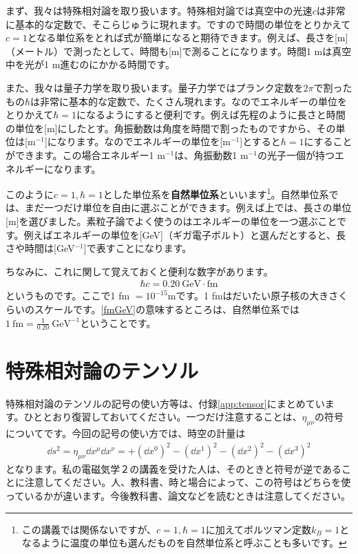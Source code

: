 \documentclass[report,paper=a4, fontsize=12pt, line_length=16cm, number_of_lines=33,dvipdfmx]{jlreq}
\numberwithin{equation}{chapter}
\newcommand{\strong}[1]{{\sffamily \bfseries #1}}
\begin{document}
まず、我々は特殊相対論を取り扱います。特殊相対論では真空中の光速$c$は非常に基本的な定数で、そこらじゅうに現れます。ですので時間の単位をとりかえて$c=1$となる単位系をとれば式が簡単になると期待できます。例えば、長さを[m]（メートル）で測ったとして、時間も[m]で測ることになります。時間1 mは真空中を光が1 m進むのにかかる時間です。

また、我々は量子力学を取り扱います。量子力学ではプランク定数を$2\pi$で割ったもの$\hbar$は非常に基本的な定数で、たくさん現れます。なのでエネルギーの単位をとりかえて$\hbar=1$になるようにすると便利です。例えば先程のように長さと時間の単位を[m]にしたとす。角振動数は角度を時間で割ったものですから、その単位は[m${}^{-1}$]になります。なのでエネルギーの単位を[m${}^{-1}$]とすると$\hbar=1$にすることができます。この場合エネルギー1 m${}^{-1}$は、角振動数1 m${}^{-1}$の光子一個が持つエネルギーになります。

このように$c=1,\hbar=1$とした単位系を\strong{自然単位系}といいます\footnote{この講義では関係ないですが、$c=1, \hbar=1$に加えてボルツマン定数$k_B=1$となるように温度の単位も選んだものを自然単位系と呼ぶことも多いです。}。自然単位系では、まだ一つだけ単位を自由に選ぶことができます。例えば上では、長さの単位[m]を選びました。素粒子論でよく使うのはエネルギーの単位を一つ選ぶことです。例えばエネルギーの単位を[GeV]（ギガ電子ボルト）と選んだとすると、長さや時間は[GeV${}^{-1}$]で表すことになります。

ちなみに、これに関して覚えておくと便利な数字があります。
\begin{align}
  \hbar c = 0.20 \mathrm{\ GeV\cdot fm}\label{fmGeV}
\end{align}
というものです。ここで1 fm $=10^{-15}$mです。1 fmはだいたい原子核の大きさくらいのスケールです。\eqref{fmGeV}の意味するところは、自然単位系では$1\ \mathrm{ fm}=\frac{1}{0.20}\ \mathrm{GeV}^{-1}$ということです。

\section{特殊相対論のテンソル}
特殊相対論のテンソルの記号の使い方等は、付録\ref{app:tensor}にまとめています。ひととおり復習しておいてください。一つだけ注意することは、$\eta_{\mu\nu}$の符号についてです。今回の記号の使い方では、時空の計量は
\begin{align}
  \dd{s}^2=\eta_{\mu\nu}\dd{x}^{\mu}\dd{x}^{\nu}=+(\dd{x}^0)^2
  -(\dd{x}^1)^2
  -(\dd{x}^2)^2
  -(\dd{x}^3)^2\label{metric}
\end{align}
となります。私の電磁気学２の講義を受けた人は、そのときと符号が逆であることに注意してください。人、教科書、時と場合によって、この符号はどちらを使っているかが違います。今後教科書、論文などを読むときは注意してください。
\end{document}
